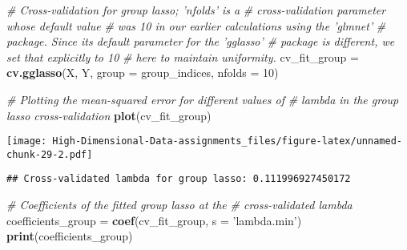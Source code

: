 \documentclass[
]{book}
\newenvironment{Shaded}{\begin{snugshade}}{\end{snugshade}}
\newcommand{\CommentTok}[1]{\textcolor[rgb]{0.56,0.35,0.01}{\textit{#1}}}
\newcommand{\DataTypeTok}[1]{\textcolor[rgb]{0.13,0.29,0.53}{#1}}
\newcommand{\DecValTok}[1]{\textcolor[rgb]{0.00,0.00,0.81}{#1}}
\newcommand{\KeywordTok}[1]{\textcolor[rgb]{0.13,0.29,0.53}{\textbf{#1}}}
\newcommand{\NormalTok}[1]{#1}
\newcommand{\OperatorTok}[1]{\textcolor[rgb]{0.81,0.36,0.00}{\textbf{#1}}}
\newcommand{\StringTok}[1]{\textcolor[rgb]{0.31,0.60,0.02}{#1}}
\begin{document}
\begin{Shaded}
\begin{Highlighting}[]
\CommentTok{# Cross-validation for group lasso; 'nfolds' is a}
\CommentTok{# cross-validation parameter whose default value}
\CommentTok{# was 10 in our earlier calculations using the 'glmnet'}
\CommentTok{# package. Since its default parameter for the 'gglasso'}
\CommentTok{# package is different, we set that explicitly to 10}
\CommentTok{# here to maintain uniformity.}
\NormalTok{cv_fit_group =}\StringTok{ }\KeywordTok{cv.gglasso}\NormalTok{(X, Y, }\DataTypeTok{group =}\NormalTok{ group_indices,}
                          \DataTypeTok{nfolds =} \DecValTok{10}\NormalTok{)}

\CommentTok{# Plotting the mean-squared error for different values of}
\CommentTok{# lambda in the group lasso cross-validation}
\KeywordTok{plot}\NormalTok{(cv_fit_group)}
\end{Highlighting}
\end{Shaded}

\texttt{[image: High-Dimensional-Data-assignments\_files/figure-latex/unnamed-chunk-29-2.pdf]}

\begin{Shaded}
\end{Shaded}

\begin{verbatim}
## Cross-validated lambda for group lasso: 0.111996927450172
\end{verbatim}

\begin{Shaded}
\begin{Highlighting}[]
\CommentTok{# Coefficients of the fitted group lasso at the}
\CommentTok{# cross-validated lambda}
\NormalTok{coefficients_group =}\StringTok{ }\KeywordTok{coef}\NormalTok{(cv_fit_group, }\DataTypeTok{s =} \StringTok{'lambda.min'}\NormalTok{)}
\KeywordTok{print}\NormalTok{(coefficients_group)}
\end{Highlighting}
\end{Shaded}
\end{document}
